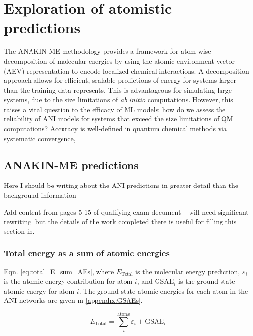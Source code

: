 \chapter{Exploration of atomistic predictions}
\label{chapter2}

The ANAKIN-ME methodology provides a framework for atom-wise decomposition of molecular energies by using the atomic environment vector (AEV) representation to encode localized chemical interactions.
A decomposition approach allows for efficient, scalable predictions of energy for systems larger than the training data represents.
This is advantageous for simulating large systems, due to the size limitations of \textit{ab initio} computations.
However, this raises a vital question to the efficacy of ML models: how do we assess the reliability of ANI models for systems that exceed the size limitations of QM computations?
Accuracy is well-defined in quantum chemical methods via systematic convergence, 

\section{ANAKIN-ME predictions}
\label{sec:ANI_predictions}

Here I should be writing about the ANI predictions in greater detail than the background information

Add content from pages 5-15 of qualifying exam document -- will need significant rewriting, but the details of the work completed there is useful for filling this section in. 


\subsection{Total energy as a sum of atomic energies}
\label{subsec:total_E_sum_AEs}

Eqn. \ref{eq:total_E_sum_AEs}, where $E_{\text{Total}}$ is the molecular energy prediction, $\varepsilon_i$ is the atomic energy contribution for atom $i$, and $\text{GSAE}_i$ is the ground state atomic energy for atom $i$.
The ground state atomic energies for each atom in the ANI networks are given in \ref{appendix:GSAEs}.

\begin{equation}
    E_{\text{Total}} = \sum_{i}^{\text{atoms}} \varepsilon_i + \text{GSAE}_i
    \label{eq:total_E_sum_AEs}
\end{equation}


